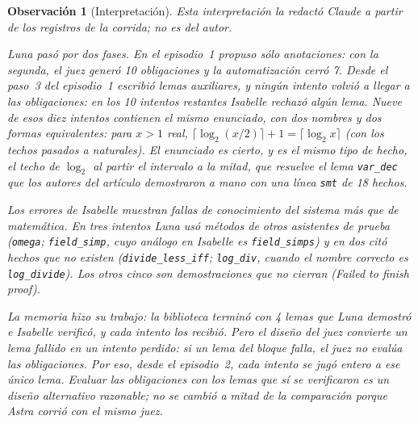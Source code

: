 \documentclass[11pt,a4paper]{article}
\newtheorem{remark}{Observación}
\begin{document}
\begin{remark}[Interpretación]
Esta interpretación la redactó Claude a partir de los registros de la corrida; no es del autor.

Luna pasó por dos fases. En el episodio~1 propuso sólo anotaciones: con la segunda, el juez generó 10 obligaciones y la automatización cerró 7. Desde el paso~3 del episodio~1 escribió lemas auxiliares, y ningún intento volvió a llegar a las obligaciones: en los 10 intentos restantes Isabelle rechazó algún lema. Nueve de esos diez intentos contienen el mismo enunciado, con dos nombres y dos formas equivalentes: para $x > 1$ real, $\lceil \log_2 (x/2) \rceil + 1 = \lceil \log_2 x \rceil$ (con los techos pasados a naturales). El enunciado es cierto, y es el mismo tipo de hecho, el techo de $\log_2$ al partir el intervalo a la mitad, que resuelve el lema \texttt{var\_dec} que los autores del artículo demostraron a mano con una línea \texttt{smt} de 18 hechos.

Los errores de Isabelle muestran fallas de conocimiento del sistema más que de matemática. En tres intentos Luna usó métodos de otros asistentes de prueba (\texttt{omega}; \texttt{field\_simp}, cuyo análogo en Isabelle es \texttt{field\_simps}) y en dos citó hechos que no existen (\texttt{divide\_less\_iff}; \texttt{log\_div}, cuando el nombre correcto es \texttt{log\_divide}). Los otros cinco son demostraciones que no cierran (\emph{Failed to finish proof}).

La memoria hizo su trabajo: la biblioteca terminó con 4 lemas que Luna demostró e Isabelle verificó, y cada intento los recibió. Pero el diseño del juez convierte un lema fallido en un intento perdido: si un lema del bloque falla, el juez no evalúa las obligaciones. Por eso, desde el episodio~2, cada intento se jugó entero a ese único lema. Evaluar las obligaciones con los lemas que sí se verificaron es un diseño alternativo razonable; no se cambió a mitad de la comparación porque Astra corrió con el mismo juez.
\end{remark}


\end{document}
